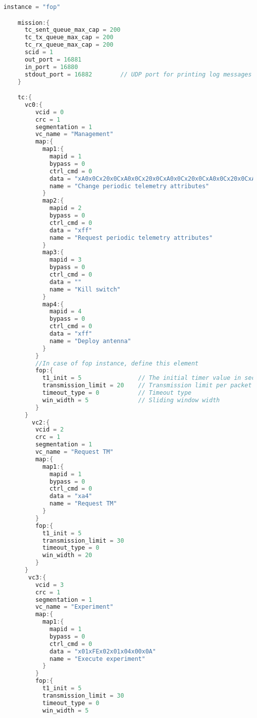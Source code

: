 \documentclass[english,title,a4paper]{report}
\begin{document}
\begin{lstlisting}[language=C, caption = FOP example configuration]
    instance = "fop"

    mission:{
      tc_sent_queue_max_cap = 200
      tc_tx_queue_max_cap = 200
      tc_rx_queue_max_cap = 200
      scid = 1
      out_port = 16881
      in_port = 16880
      stdout_port = 16882        // UDP port for printing log messages
    }

    tc:{
      vc0:{
         vcid = 0
         crc = 1
         segmentation = 1
         vc_name = "Management"
         map:{
           map1:{
             mapid = 1
             bypass = 0
             ctrl_cmd = 0
             data = "xA0x0Cx20x0CxA0x0Cx20x0CxA0x0Cx20x0CxA0x0Cx20x0CxA0x0Cx20x0CxA0x0Cx20x0C"
             name = "Change periodic telemetry attributes"
           }
           map2:{
             mapid = 2
             bypass = 0
             ctrl_cmd = 0
             data = "xff"
             name = "Request periodic telemetry attributes"
           }
           map3:{
             mapid = 3
             bypass = 0
             ctrl_cmd = 0
             data = ""
             name = "Kill switch"
           }
           map4:{
             mapid = 4
             bypass = 0
             ctrl_cmd = 0
             data = "xff"
             name = "Deploy antenna"
           }
         }
         //In case of fop instance, define this element
         fop:{
           t1_init = 5                // The initial timer value in sec
           transmission_limit = 20    // Transmission limit per packet
           timeout_type = 0           // Timeout type
           win_width = 5              // Sliding window width
         }
      }
        vc2:{
         vcid = 2
         crc = 1
         segmentation = 1
         vc_name = "Request TM"
         map:{
           map1:{
             mapid = 1
             bypass = 0
             ctrl_cmd = 0
             data = "xa4"
             name = "Request TM"
           }
         }
         fop:{
           t1_init = 5
           transmission_limit = 30
           timeout_type = 0
           win_width = 20
         }
      }
       vc3:{
         vcid = 3
         crc = 1
         segmentation = 1
         vc_name = "Experiment"
         map:{
           map1:{
             mapid = 1
             bypass = 0
             ctrl_cmd = 0
             data = "x01xFEx02x01x04x00x0A"
             name = "Execute experiment"
           }
         }
         fop:{
           t1_init = 5
           transmission_limit = 30
           timeout_type = 0
           win_width = 5

\end{lstlisting}
\end{document}
